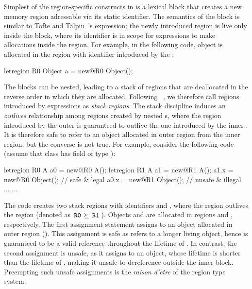 Simplest of the region-specific constructs in \name is a 
lexical block that creates a new memory region adressable via its
static identifier. The semantics of the  block is similar
to Tofte and Talpin~\cite{ttpopl94}'s  expression; the
newly introduced region is live only inside the block, where its
identifier is in scope for  expressions to make allocations
inside the region. For example, in the following code, object  is
allocated in the region with identifier  introduced by the
:
\begin{center}
\begin{codejava}
  letregion R0 {
    Object a = new@R0 Object();
  }
\end{codejava}
\end{center}
The  blocks can be nested, leading to a stack of regions
that are deallocated in the reverse order in which they are allocated.
Following ~\cite{cyclonepldi02}, we therefore call regions introduced
by  expressions as \emph{stack regions}. The stack
discipline induces an \emph{outlives} relationship among regions created
by nested s, where the region introduced by the outer
 is guaranteed to outlive the one introduced by the inner
. It is therefore safe to refer to an object allocated in
outer region from the inner region, but the converse is not true. For
example, consider the following code (assume that class  has
field  of type ):
\begin{center}
\begin{codejava}
  letregion R0 {
    A a0 = new@R0 A();
    letregion R1 {
      A a1 = new@R1 A();
      a1.x = new@R0 Object(); // safe & legal
      a0.x = new@R1 Object(); // unsafe & illegal
      ...
    }
    ...
  }
\end{codejava}
\end{center}
The code creates two stack regions with identifiers  and ,
where the region  outlives the region  (denoted as $\,{\tt R0}\,
\succeq \,{\tt R1}\,$).  Objects  and  are allocated in regions
 and , respectively. The first assignment statement
assigns to  an object allocated in outer region (). This
assignment is safe as  refers to a longer living object, hence
is guaranteed to be a valid reference throughout the lifetime of
.  In contrast, the second assignment is unsafe, as it assigns
to  an object, whose lifetime is shorter than the lifetime of
, making it unsafe to dereference  outside the inner
block. 
Preempting such unsafe assignments is the \emph{raison d'etre} of the
region type system.

